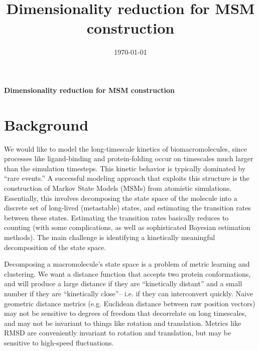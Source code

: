 \documentclass[aps,prl,preprint,nofootinbib,superscriptaddress,linenumbers]{revtex4-1}
\begin{document}

\title{Dimensionality reduction for MSM construction}
\date{\today}




\begin{center}
\textbf{Dimensionality reduction for MSM construction}
\end{center}

\section{Background}
We would like to model the long-timescale kinetics of biomacromolecules, since processes like ligand-binding and protein-folding occur on timescales much larger than the simulation timesteps.
This kinetic behavior is typically dominated by ``rare events.''
A successful modeling approach that exploits this structure is the construction of Markov State Models (MSMs) from atomistic simulations.
Essentially, this involves decomposing the state space of the molecule into a discrete set of long-lived (metastable) states, and estimating the transition rates between these states.
Estimating the transition rates basically reduces to counting (with some complications, as well as sophisticated Bayesian estimation methods).
The main challenge is identifying a kinetically meaningful decomposition of the state space.

Decomposing a macromolecule's state space is a problem of metric learning and clustering. We want a distance function that accepts two protein conformations, and will produce a large distance if they are ``kinetically distant'' and a small number if they are ``kinetically close''-- i.e. if they can interconvert quickly. Naive geometric distance metrics (e.g. Euclidean distance between raw position vectors) may not be sensitive to degrees of freedom that decorrelate on long timescales, and may not be invariant to things like rotation and translation. Metrics like RMSD are conveniently invariant to rotation and translation, but may be sensitive to high-speed fluctuations.
\end{document}
